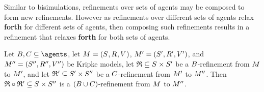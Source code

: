 Similar to bisimulations, refinements over sets of agents may be composed to form new refinements.
However as refinements over different sets of agents relax {\bf forth} for different sets of agents, then composing such refinements results in a refinement that relaxes {\bf forth} for both sets of agents.

\begin{proposition}\label{refinement-composition}
Let $\agentsB, \agentsC \subseteq \agents$, let $\kModelAndTuple$, $\kModelAndTupleP$, and $\kModelAndTuplePP$ be Kripke models, let $\refinement \subseteq \kStates \times \kStatesP$ be a $B$-refinement from $\kModel$ to ${M^{\prime}_{}}$, and let $\mathfrak{R}' \subseteq {S^{\prime}} \times {S^{\prime\prime}}$ be a $C$-refinement from ${M^{\prime}_{}}$ to ${M^{\prime\prime}_{}}$.
Then $\refinement \circ \refinement' \subseteq \kStates \times \kStatesPP$ is a $(B \cup C)$-refinement from $\kModel$ to ${M^{\prime\prime}_{}}$.
\end{proposition}

